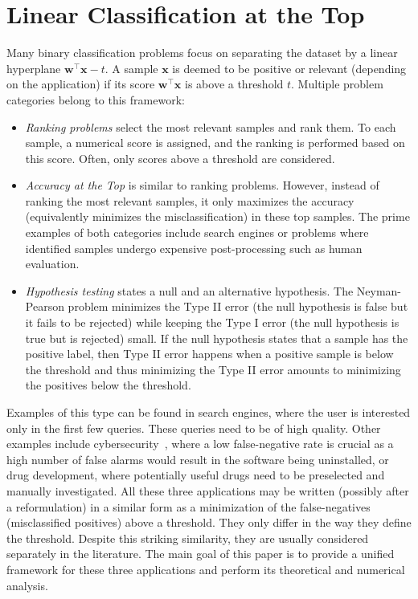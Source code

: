 \chapter{Linear Classification at the Top}

Many binary classification problems focus on separating the dataset by a linear hyperplane $\bm{w}^\top \bm{x} - t$. A sample $\bm{x}$ is deemed to be positive or relevant (depending on the application) if its score $\bm{w}^\top \bm{x}$ is above a threshold $t$. Multiple problem categories belong to this framework:
\begin{itemize}
  \item \textit{Ranking problems} select the most relevant samples and rank them. To each sample, a numerical score is assigned, and the ranking is performed based on this score. Often, only scores above a threshold are considered.
  \item \textit{Accuracy at the Top} is similar to ranking problems. However, instead of ranking the most relevant samples, it only maximizes the accuracy (equivalently minimizes the misclassification) in these top samples. The prime examples of both categories include search engines or problems where identified samples undergo expensive post-processing such as human evaluation.
  \item \textit{Hypothesis testing} states a null and an alternative hypothesis. The Neyman-Pearson problem minimizes the Type II error (the null hypothesis is false but it fails to be rejected) while keeping the Type I error (the null hypothesis is true but is rejected) small. If the null hypothesis states that a sample has the positive label, then Type II error happens when a positive sample is below the threshold and thus minimizing the Type II error amounts to minimizing the positives below the threshold.
\end{itemize}
Examples of this type can be found in search engines, where the user is interested only in the first few queries. These queries need to be of high quality. Other examples include cybersecurity~\cite{grill2016learning}, where a low false-negative rate is crucial as a high number of false alarms would result in the software being uninstalled, or drug development, where potentially useful drugs need to be preselected and manually investigated. All these three applications may be written (possibly after a reformulation) in a similar form as a minimization of the false-negatives (misclassified positives) above a threshold. They only differ in the way they define the threshold. Despite this striking similarity, they are usually considered separately in the literature. The main goal of this paper is to provide a unified framework for these three applications and perform its theoretical and numerical analysis.

